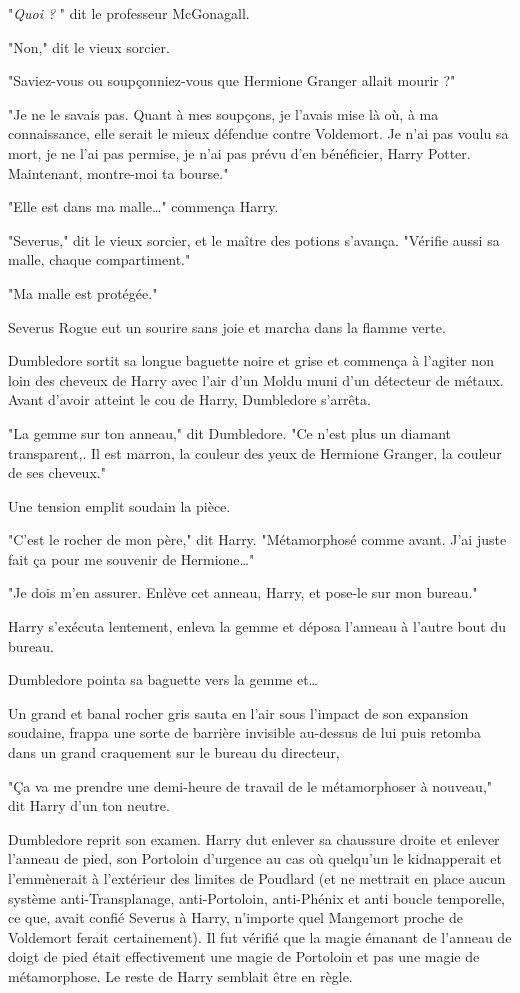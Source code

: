 "\emph{Quoi ?} " dit le professeur McGonagall.

"Non," dit le vieux sorcier.

"Saviez-vous ou soupçonniez-vous que Hermione Granger allait mourir ?"

"Je ne le savais pas. Quant à mes soupçons, je l'avais mise là où, à ma connaissance, elle serait le mieux défendue contre Voldemort. Je n'ai pas voulu sa mort, je ne l'ai pas permise, je n'ai pas prévu d'en bénéficier, Harry Potter. Maintenant, montre-moi ta bourse."

"Elle est dans ma malle…" commença Harry.

"Severus," dit le vieux sorcier, et le maître des potions s'avança. "Vérifie aussi sa malle, chaque compartiment."

"Ma malle est protégée."

Severus Rogue eut un sourire sans joie et marcha dans la flamme verte.

Dumbledore sortit sa longue baguette noire et grise et commença à l'agiter non loin des cheveux de Harry avec l'air d'un Moldu muni d'un détecteur de métaux. Avant d'avoir atteint le cou de Harry, Dumbledore s'arrêta.

"La gemme sur ton anneau," dit Dumbledore. "Ce n'est plus un diamant transparent,. Il est marron, la couleur des yeux de Hermione Granger, la couleur de ses cheveux."

Une tension emplit soudain la pièce.

"C'est le rocher de mon père," dit Harry. "Métamorphosé comme avant. J'ai juste fait ça pour me souvenir de Hermione…"

"Je dois m'en assurer. Enlève cet anneau, Harry, et pose-le sur mon bureau."

Harry s'exécuta lentement, enleva la gemme et déposa l'anneau à l'autre bout du bureau.

Dumbledore pointa sa baguette vers la gemme et…

Un grand et banal rocher gris sauta en l'air sous l'impact de son expansion soudaine, frappa une sorte de barrière invisible au-dessus de lui puis retomba dans un grand craquement sur le bureau du directeur,

"Ça va me prendre une demi-heure de travail de le métamorphoser à nouveau," dit Harry d'un ton neutre.

Dumbledore reprit son examen. Harry dut enlever sa chaussure droite et enlever l'anneau de pied, son Portoloin d'urgence au cas où quelqu'un le kidnapperait et l'emmènerait à l'extérieur des limites de Poudlard (et ne mettrait en place aucun système anti-Transplanage, anti-Portoloin, anti-Phénix et anti boucle temporelle, ce que, avait confié Severus à Harry, n'importe quel Mangemort proche de Voldemort ferait certainement). Il fut vérifié que la magie émanant de l'anneau de doigt de pied était effectivement une magie de Portoloin et pas une magie de métamorphose. Le reste de Harry semblait être en règle.

